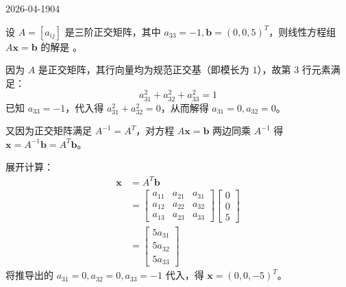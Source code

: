 \begin{mistake}{2026-04-19}{04}

\begin{problemcontent}
设 \(A=[a_{ij}]\) 是三阶正交矩阵，其中 \(a_{33}=-1, \boldsymbol{b}=(0,0,5)^T\)，则线性方程组 \(A\boldsymbol{x}=\boldsymbol{b}\) 的解是 \underline{\quad\quad\quad}。
\end{problemcontent}

\begin{solutioncontent}
因为 \(A\) 是正交矩阵，其行向量均为规范正交基（即模长为 \(1\)），故第 \(3\) 行元素满足：
\[a_{31}^2 + a_{32}^2 + a_{33}^2 = 1\]
已知 \(a_{33} = -1\)，代入得 \(a_{31}^2 + a_{32}^2 = 0\)，从而解得 \(a_{31} = 0, a_{32} = 0\)。

又因为正交矩阵满足 \(A^{-1} = A^T\)，对方程 \(A\boldsymbol{x}=\boldsymbol{b}\) 两边同乘 \(A^{-1}\) 得 \(\boldsymbol{x} = A^{-1}\boldsymbol{b} = A^T\boldsymbol{b}\)。

展开计算：
\[
\begin{aligned}
\boldsymbol{x} &= A^T \boldsymbol{b} \\
&= \begin{bmatrix}
a_{11} & a_{21} & a_{31} \\
a_{12} & a_{22} & a_{32} \\
a_{13} & a_{23} & a_{33}
\end{bmatrix}
\begin{bmatrix} 0 \\ 0 \\ 5 \end{bmatrix} \\
&= \begin{bmatrix} 5a_{31} \\ 5a_{32} \\ 5a_{33} \end{bmatrix}
\end{aligned}
\]
将推导出的 \(a_{31}=0, a_{32}=0, a_{33}=-1\) 代入，得 \(\boldsymbol{x} = (0, 0, -5)^T\)。
\end{solutioncontent}


\end{mistake}
